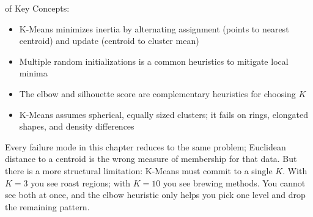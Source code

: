 of Key Concepts:
\begin{itemize}
    \item K-Means minimizes inertia by alternating assignment (points to nearest centroid) 
    and update (centroid to cluster mean)
    \item Multiple random initializations is a common heuristics to mitigate local minima
    \item The elbow and silhouette score are complementary heuristics for choosing $K$
    \item K-Means assumes spherical, equally sized clusters; it fails on rings, elongated shapes, and density differences
\end{itemize}



 Every failure mode in this chapter reduces to the same problem;
Euclidean distance to a centroid is the wrong measure of membership for that data.
But there is a more structural limitation: K-Means must commit to a single $K$.
With $K{=}3$ you see roast regions; with $K{=}10$ you see brewing methods.
You cannot see both at once, and the elbow heuristic only helps you pick one level and drop the remaining pattern.


